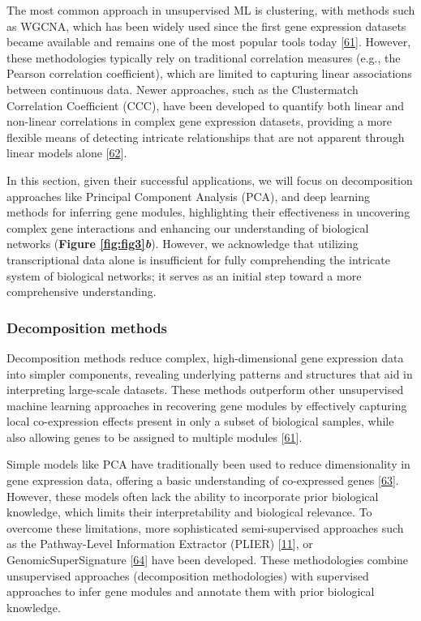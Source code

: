 The most common approach in unsupervised ML is clustering, with methods such as WGCNA, which has been widely used since the first gene expression datasets became available and remains one of the most popular tools today {[}\protect\hyperlink{ref-1BVbSrr6M}{61}{]}.
However, these methodologies typically rely on traditional correlation measures (e.g., the Pearson correlation coefficient), which are limited to capturing linear associations between continuous data.
Newer approaches, such as the Clustermatch Correlation Coefficient (CCC), have been developed to quantify both linear and non-linear correlations in complex gene expression datasets, providing a more flexible means of detecting intricate relationships that are not apparent through linear models alone {[}\protect\hyperlink{ref-YgLIM2bZ}{62}{]}.

In this section, given their successful applications, we will focus on decomposition approaches like Principal Component Analysis (PCA), and deep learning methods for inferring gene modules, highlighting their effectiveness in uncovering complex gene interactions and enhancing our understanding of biological networks (\textbf{Figure \ref{fig:fig3}\emph{b}}).
However, we acknowledge that utilizing transcriptional data alone is insufficient for fully comprehending the intricate system of biological networks; it serves as an initial step toward a more comprehensive understanding.

\hypertarget{decomposition-methods}{%
\subsubsection{Decomposition methods}\label{decomposition-methods}}

Decomposition methods reduce complex, high-dimensional gene expression data into simpler components, revealing underlying patterns and structures that aid in interpreting large-scale datasets.
These methods outperform other unsupervised machine learning approaches in recovering gene modules by effectively capturing local co-expression effects present in only a subset of biological samples, while also allowing genes to be assigned to multiple modules {[}\protect\hyperlink{ref-1BVbSrr6M}{61}{]}.

Simple models like PCA have traditionally been used to reduce dimensionality in gene expression data, offering a basic understanding of co-expressed genes {[}\protect\hyperlink{ref-1703M7bru}{63}{]}.
However, these models often lack the ability to incorporate prior biological knowledge, which limits their interpretability and biological relevance.
To overcome these limitations, more sophisticated semi-supervised approaches such as the Pathway-Level Information Extractor (PLIER) {[}\protect\hyperlink{ref-Ki2ij7zE}{11}{]}, or GenomicSuperSignature {[}\protect\hyperlink{ref-X4fhSCkz}{64}{]} have been developed.
These methodologies combine unsupervised approaches (decomposition methodologies) with supervised approaches to infer gene modules and annotate them with prior biological knowledge.

